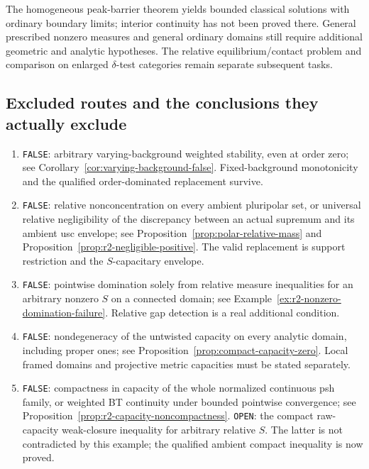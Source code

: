 The homogeneous peak-barrier theorem yields bounded classical
solutions with ordinary boundary limits; interior continuity has not
been proved there. General prescribed nonzero measures and general
ordinary domains still require additional geometric and analytic
hypotheses. The relative equilibrium/contact problem and comparison
on enlarged $\delta$-test categories remain separate subsequent tasks.

\subsection{Excluded routes and the conclusions they actually exclude}

\begin{enumerate}
\item \texttt{FALSE}: arbitrary varying-background weighted stability,
even at order zero; see
Corollary~\ref{cor:varying-background-false}. Fixed-background
monotonicity and the qualified order-dominated replacement survive.

\item \texttt{FALSE}: relative nonconcentration on every ambient
pluripolar set, or universal relative negligibility of the discrepancy
between an actual supremum and its ambient usc envelope; see
Proposition~\ref{prop:polar-relative-mass} and
Proposition~\ref{prop:r2-negligible-positive}. The valid replacement
is support restriction and the $S$-capacitary envelope.

\item \texttt{FALSE}: pointwise domination solely from relative
measure inequalities for an arbitrary nonzero $S$ on a connected
domain; see Example~\ref{ex:r2-nonzero-domination-failure}.
Relative gap detection is a real additional condition.

\item \texttt{FALSE}: nondegeneracy of the untwisted capacity on every
analytic domain, including proper ones; see
Proposition~\ref{prop:compact-capacity-zero}. Local framed domains
and projective metric capacities must be stated separately.

\item \texttt{FALSE}: compactness in capacity of the whole normalized
continuous psh family, or weighted BT continuity under bounded
pointwise convergence; see
Proposition~\ref{prop:r2-capacity-noncompactness}.
\texttt{OPEN}: the compact raw-capacity weak-closure inequality for
arbitrary relative $S$. The latter is not contradicted by this example;
the qualified ambient compact inequality is now proved.


\end{enumerate}
